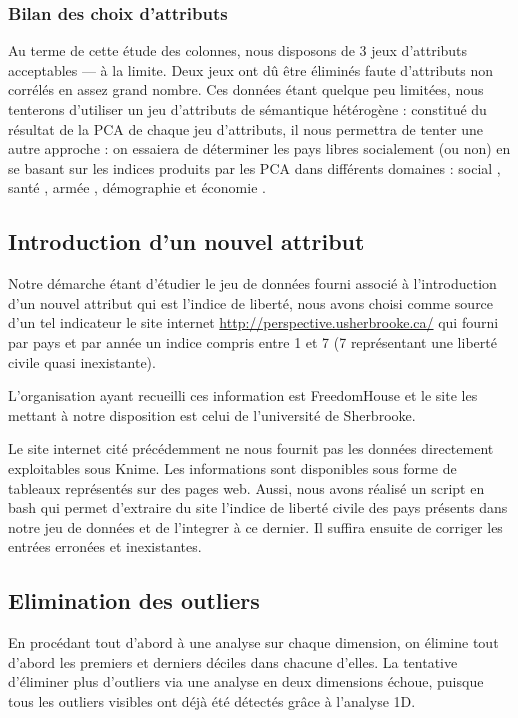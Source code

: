 \subsubsection{Bilan des choix d'attributs}
Au terme de cette étude des colonnes, nous disposons de 3 jeux d'attributs acceptables --- à la limite. Deux jeux ont dû être éliminés faute d'attributs non corrélés en assez grand nombre. Ces données étant quelque peu limitées, nous tenterons d'utiliser un jeu d'attributs de sémantique hétérogène : constitué du résultat de la PCA de chaque jeu d'attributs, il nous permettra de tenter une autre approche : on essaiera de déterminer les pays libres socialement (ou non) en se basant sur les indices produits par les PCA dans différents domaines : \og social \fg, \og santé \fg, \og armée \fg, \og démographie \fg et \og économie \fg.


\subsection{Introduction d'un nouvel attribut}


Notre démarche étant d'étudier le jeu de données fourni associé à l'introduction d'un nouvel attribut qui est l'indice de liberté, nous avons choisi comme source d'un tel indicateur le site internet \url{http://perspective.usherbrooke.ca/} qui fourni par pays et par année un indice compris entre 1 et 7 (7 représentant une liberté civile quasi inexistante).

L'organisation ayant recueilli ces information est FreedomHouse et le site les mettant à notre disposition est celui de l'université de Sherbrooke.

Le site internet cité précédemment ne nous fournit pas les données directement exploitables sous Knime. Les informations sont disponibles sous forme de tableaux représentés sur des pages web. Aussi, nous avons réalisé un script en bash qui permet d'extraire du site l'indice de liberté civile des pays présents dans notre jeu de données et de l'integrer à ce dernier. Il suffira ensuite de corriger les entrées erronées et inexistantes.


\subsection{Elimination des outliers}
En procédant tout d'abord à une analyse sur chaque dimension, on élimine tout d'abord les premiers et derniers déciles dans chacune d'elles.
La tentative d'éliminer plus d'outliers via une analyse en deux dimensions échoue, puisque tous les outliers visibles ont déjà été détectés grâce à l'analyse 1D.

